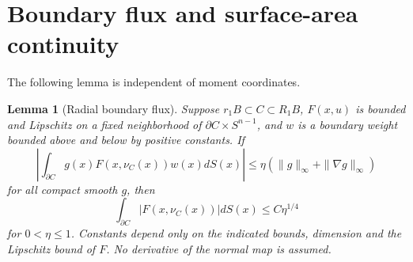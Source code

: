 \documentclass[11pt,reqno]{amsart}
\numberwithin{equation}{section}
\newtheorem{lemma}[theorem]{Lemma}
\theoremstyle{remark}
\theoremstyle{definition}
\begin{document}
\section{Boundary flux and surface-area continuity}

The following lemma is independent of moment coordinates.

\begin{lemma}[Radial boundary flux]
Suppose \(r_1B\subset C\subset R_1B\), \(F(x,u)\) is bounded and Lipschitz on a fixed neighborhood of \(\partial C\times S^{n-1}\), and \(w\) is a boundary weight bounded above and below by positive constants. If
\[
\left|\int_{\partial C}g(x)F(x,\nu_C(x))w(x)dS(x)\right|
\le\eta(\|g\|_\infty+\|\nabla g\|_\infty)
\]
for all compact smooth \(g\), then
\[
\int_{\partial C}|F(x,\nu_C(x))|dS(x)\le C\eta^{1/4}                 \tag{5.1}
\]
for \(0<\eta\le1\). Constants depend only on the indicated bounds, dimension and the Lipschitz bound of \(F\). No derivative of the normal map is assumed.
\end{lemma}
\end{document}
